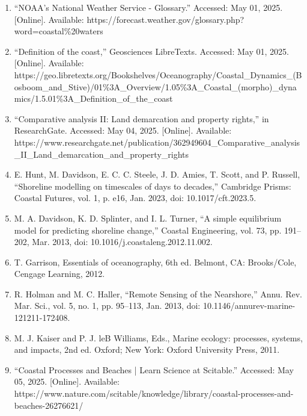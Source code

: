 \documentclass{article}
\begin{document}
\begin{enumerate}

    \item{“NOAA’s National Weather Service - Glossary.” Accessed: May 01, 2025. [Online]. Available: https://forecast.weather.gov/glossary.php?word=coastal\%20waters}
    
    \item{“Definition of the coast,” Geosciences LibreTexts. Accessed: May 01, 2025. [Online]. Available: https://geo.libretexts.org/Bookshelves/Oceanography/Coastal_Dynamics_(Bosboom_and_Stive)/01\%3A_Overview/1.05\%3A_Coastal_(morpho)_dynamics/1.5.01\%3A_Definition_of_the_coast}
    
    \item{“Comparative analysis II: Land demarcation and property rights,” in ResearchGate. Accessed: May 04, 2025. [Online]. Available: https://www.researchgate.net/publication/362949604_Comparative_analysis_II_Land_demarcation_and_property_rights}
    
    \item{E. Hunt, M. Davidson, E. C. C. Steele, J. D. Amies, T. Scott, and P. Russell, “Shoreline modelling on timescales of days to decades,” Cambridge Prisms: Coastal Futures, vol. 1, p. e16, Jan. 2023, doi: 10.1017/cft.2023.5.}

    \item{M. A. Davidson, K. D. Splinter, and I. L. Turner, “A simple equilibrium model for predicting shoreline change,” Coastal Engineering, vol. 73, pp. 191–202, Mar. 2013, doi: 10.1016/j.coastaleng.2012.11.002.}

    \item{T. Garrison, Essentials of oceanography, 6th ed. Belmont, CA: Brooks/Cole, Cengage Learning, 2012.}

    \item{R. Holman and M. C. Haller, “Remote Sensing of the Nearshore,” Annu. Rev. Mar. Sci., vol. 5, no. 1, pp. 95–113, Jan. 2013, doi: 10.1146/annurev-marine-121211-172408.}

    \item{M. J. Kaiser and P. J. leB Williams, Eds., Marine ecology: processes, systems, and impacts, 2nd ed. Oxford; New York: Oxford University Press, 2011.}

    \item{“Coastal Processes and Beaches | Learn Science at Scitable.” Accessed: May 05, 2025. [Online]. Available: https://www.nature.com/scitable/knowledge/library/coastal-processes-and-beaches-26276621/}


\end{enumerate}
\end{document}
